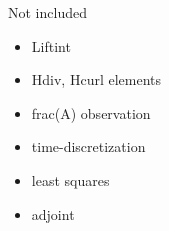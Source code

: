 
Not included 
\begin{itemize}
\item Liftint  
\item Hdiv, Hcurl elements 
\item frac(A) observation 
\item time-discretization 
\item least squares 
\item adjoint 
\end{itemize}
